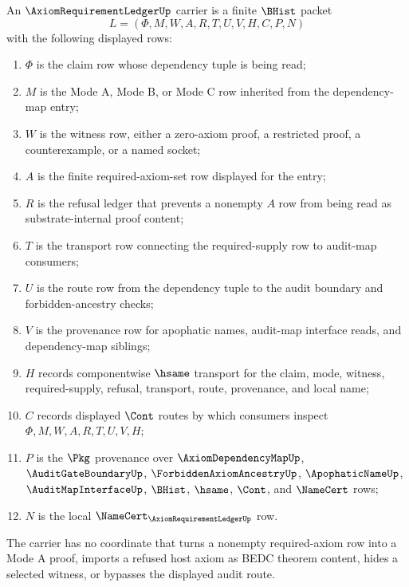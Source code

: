 \begin{definition}
\label{def:axiom-requirement-ledger-carrier}
An $\AxiomRequirementLedgerUp$ carrier is a finite $\BHist$ packet
$$
L=(\Phi,M,W,A,R,T,U,V,H,C,P,N)
$$
with the following displayed rows:
\begin{enumerate}
\item $\Phi$ is the claim row whose dependency tuple is being read;
\item $M$ is the Mode A, Mode B, or Mode C row inherited from the dependency-map entry;
\item $W$ is the witness row, either a zero-axiom proof, a restricted proof, a counterexample, or a named socket;
\item $A$ is the finite required-axiom-set row displayed for the entry;
\item $R$ is the refusal ledger that prevents a nonempty $A$ row from being read as substrate-internal proof content;
\item $T$ is the transport row connecting the required-supply row to audit-map consumers;
\item $U$ is the route row from the dependency tuple to the audit boundary and forbidden-ancestry checks;
\item $V$ is the provenance row for apophatic names, audit-map interface reads, and dependency-map siblings;
\item $H$ records componentwise $\hsame$ transport for the claim, mode, witness, required-supply, refusal, transport, route, provenance, and local name;
\item $C$ records displayed $\Cont$ routes by which consumers inspect $\Phi,M,W,A,R,T,U,V,H$;
\item $P$ is the $\Pkg$ provenance over $\AxiomDependencyMapUp$, $\AuditGateBoundaryUp$, $\ForbiddenAxiomAncestryUp$, $\ApophaticNameUp$, $\AuditMapInterfaceUp$, $\BHist$, $\hsame$, $\Cont$, and $\NameCert$ rows;
\item $N$ is the local $\NameCert_{\AxiomRequirementLedgerUp}$ row.
\end{enumerate}
The carrier has no coordinate that turns a nonempty required-axiom row into a Mode A proof, imports a refused host axiom as BEDC theorem content, hides a selected witness, or bypasses the displayed audit route.
\end{definition}

